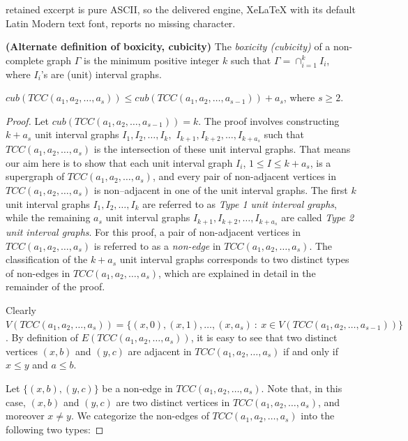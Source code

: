 \documentclass[10pt,a4paper]{amsart}
\newcommand{\G}{\Gamma}
\newcommand{\TT}{TCC(a_1,a_2,\dots,a_s)}
\newcommand{\T}{TCC(a_1,a_2,\dots,a_{s-1})}
\begin{document}
retained excerpt is pure ASCII, so the delivered engine, XeLaTeX with its default Latin Modern text font, reports no missing character.
\begin{definition}\label{boxicity def 2}\textbf{(Alternate definition of boxicity, cubicity)} The \emph{boxicity (cubicity)} of a non-complete graph $\G$ is the minimum positive integer $k$ such that $\G = \cap_{i=1}^k I_i $, where $I_i$'s are (unit) interval graphs.
    
\end{definition}

\begin{lemma}\label{inductive process}
    $cub(\TT) \leq cub(\T)+a_s$, where $s \geq 2$.
\end{lemma}

\begin{proof} Let \( cub(\T) = k \). The proof involves constructing \( k + a_s \) unit interval graphs \( I_1, I_2, \dots, I_k,\) \(I_{k+1}, I_{k+2}, \dots, I_{k+a_s} \) such that \(\TT\) is the intersection of these unit interval graphs. That means our aim here is to show that each unit interval graph $I_i$, $1 \leq I \leq k+a_s$, is a supergraph of $\TT$, and every pair of non-adjacent vertices in $\TT$ is non--adjacent in one of the unit interval graphs. The first \( k \) unit interval graphs \( I_1, I_2, \dots, I_k \) are referred to as \textit{Type 1 unit interval graphs}, while the remaining \( a_s \) unit interval graphs \( I_{k+1}, I_{k+2}, \dots, I_{k+a_s} \) are called \textit{Type 2 unit interval graphs}. For this proof, a pair of non-adjacent vertices in $\TT$ is referred to as a \textit{non-edge} in \(\TT\). The classification of the \( k + a_s \) unit interval graphs corresponds to two distinct types of non-edges in \(\TT\), which are explained in detail in the remainder of the proof.

Clearly $V(\TT)=\{ (x,0),(x,1),\dots,(x,a_s) \ : \ x \in V(\T)\}$. By definition of $E(\TT)$, it is easy to see that two distinct vertices $(x,b)$ and $(y,c)$ are adjacent in $\TT$ if and only if $x \leq y$ and $a \leq b$.

     Let $\{(x,b),(y,c)\}$ be a non-edge in $\TT$. Note that, in this case, $(x,b)$ and $(y,c)$ are two distinct vertices in $\TT$, and moreover $x \neq y$. We categorize the non-edges of $\TT$ into the following two types:

\vspace{0.2cm}


\end{proof}
\end{document}
